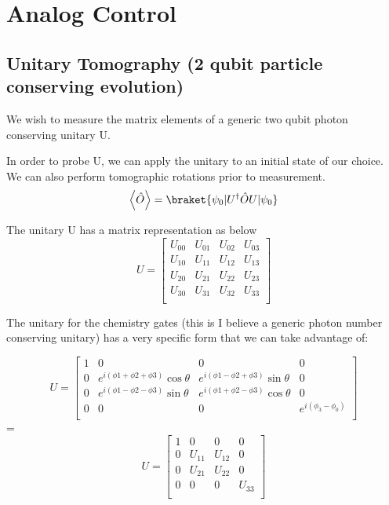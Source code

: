 \chapter[Analog Control]{Analog Control}


\section{Unitary Tomography (2 qubit particle conserving evolution)}
We wish to measure the matrix elements of a generic two qubit photon conserving unitary U.

In order to probe U, we can apply the unitary to an initial state of our choice.  We can also perform tomographic rotations prior to measurement.
\begin{equation}
    \left< \hat{O} \right> = \braket{\psi_0 | U^{\dagger} \hat{O} U | \psi_0 }
\end{equation}

The unitary U has a matrix representation as below
\begin{equation}
    U =
    \begin{bmatrix}
        U_{00} & U_{01} & U_{02} & U_{03} \\
        U_{10} & U_{11} & U_{12} & U_{13} \\
        U_{20} & U_{21} & U_{22} & U_{23} \\
        U_{30} & U_{31} & U_{32} & U_{33} \\
    \end{bmatrix}
\end{equation}

The unitary for the chemistry gates (this is I believe a generic photon number conserving unitary) has a very specific form that we can take advantage of:

\begin{equation}
    U=
    \begin{bmatrix}
        1 & 0 & 0 & 0 \\
        0 & e^{ i (\phi{1} + \phi{2} + \phi{3})}\cos{\theta} & e^{ i (\phi{1} - \phi{2} + \phi{3})}\sin{\theta} & 0 \\
        0 & e^{ i (\phi{1} - \phi{2} - \phi{3})}\sin{\theta} & e^{ i (\phi{1} + \phi{2} - \phi{3})}\cos{\theta} & 0 \\
        0 & 0 & 0 & e^{i (\phi_{3}-\phi_{0})} \\
    \end{bmatrix}
\end{equation}=
\begin{equation}
    U=
    \begin{bmatrix}
        1 & 0 & 0 & 0 \\
        0 & U_{11} & U_{12} & 0 \\
        0 & U_{21} & U_{22} & 0 \\
        0 & 0 & 0 & U_{33} \\
    \end{bmatrix}
\end{equation}


